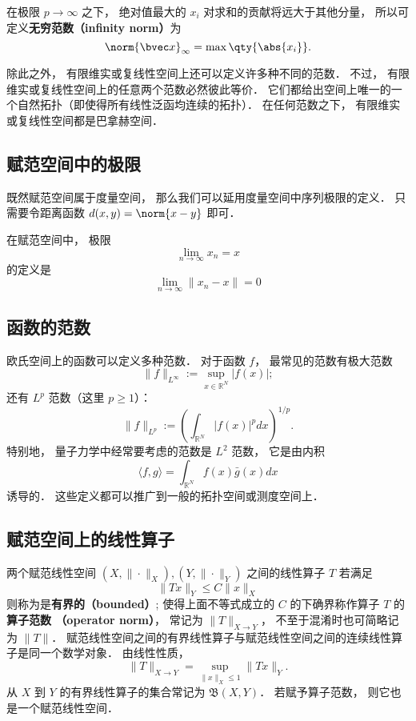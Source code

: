在极限 $p \to \infty$ 之下， 绝对值最大的 $x_i$ 对求和的贡献将远大于其他分量， 所以可定义\textbf{无穷范数（infinity norm）}为
\begin{equation}
\norm{\bvec x}_\infty = \max \qty{\abs{x_i}}.
\end{equation}

除此之外， 有限维实或复线性空间上还可以定义许多种不同的范数． 不过， 有限维实或复线性空间上的任意两个范数必然彼此等价． 它们都给出空间上唯一的一个自然拓扑（即使得所有线性泛函均连续的拓扑）． 在任何范数之下， 有限维实或复线性空间都是巴拿赫空间．

\subsection{赋范空间中的极限}
既然赋范空间属于度量空间， 那么我们可以延用度量空间中序列极限的定义． 只需要令距离函数 $d(x, y) = \norm{x - y}$ 即可．

在赋范空间中， 极限
\begin{equation}
\lim_{n\to\infty} x_n = x
\end{equation}
的定义是
\begin{equation}
\lim_{n\to\infty} \|{x_n - x}\|= 0
\end{equation}

\subsection{函数的范数}
欧氏空间上的函数可以定义多种范数． 对于函数 $f$， 最常见的范数有极大范数
$$
\|f\|_{L^\infty}:=\sup_{x\in\mathbb{R}^N}|f(x)|;
$$
还有 $L^p$ 范数（这里 $p\geq1$）：
$$
\|f\|_{L^p}:=\left(\int_{\mathbb{R}^N}|f(x)|^pdx\right)^{1/p}.
$$
特别地， 量子力学中经常要考虑的范数是 $L^2$ 范数， 它是由内积
$$
\langle f,g\rangle=\int_{\mathbb{R}^N}f(x)\bar g(x)dx
$$
诱导的． 这些定义都可以推广到一般的拓扑空间或测度空间上．

\subsection{赋范空间上的线性算子}
两个赋范线性空间 $(X,\|\cdot\|_X),(Y,\|\cdot\|_Y)$ 之间的线性算子 $T$ 若满足
$$
\|Tx\|_Y\leq C\|x\|_X
$$
则称为是\textbf{有界的（bounded）}; 使得上面不等式成立的 $C$ 的下确界称作算子 $T$ 的\textbf{算子范数 （operator norm）}， 常记为 $\|T\|_{X\to Y}$， 不至于混淆时也可简略记为 $\|T\|$． 赋范线性空间之间的有界线性算子与赋范线性空间之间的连续线性算子是同一个数学对象． 由线性性质，
$$
\|T\|_{X\to Y}=\sup_{\|x\|_X\leq 1}\|Tx\|_Y.
$$
从 $X$ 到 $Y$ 的有界线性算子的集合常记为 $\mathfrak{B}(X,Y)$． 若赋予算子范数， 则它也是一个赋范线性空间．

